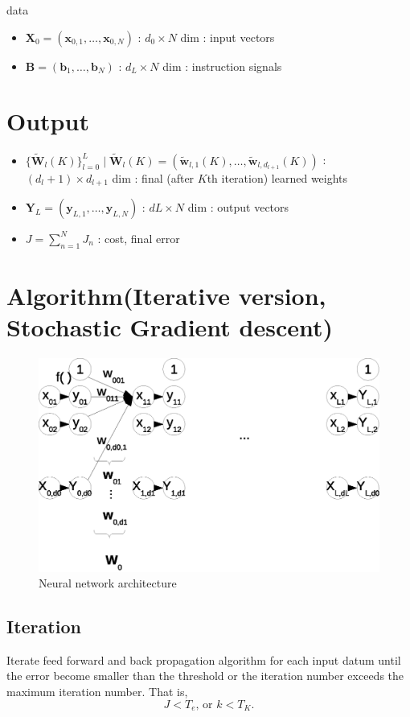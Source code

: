 \documentclass{article}
\begin{document}
data 
\begin{itemize}
\item $\bm{X}_0 = (\bm{x}_{0,1},\dots , \bm{x}_{0,N})$ : $d_0 \times N$ dim : input vectors
\item $\bm{B} = (\bm{b}_1,\dots , \bm{b}_N)$ : $d_L \times N$ dim : instruction signals
\end{itemize}


\section{Output}
\begin{itemize}
\item $\{\bm{\tilde{W}}_l(K)\}_{l=0}^L \mid \bm{\tilde{W}}_l(K) = (\bm{\tilde{w}}_{l,1}(K),\dots ,
  \bm{\tilde{w}}_{l,d_{l+1}}(K))$ : $(d_l+1) \times d_{l+1}$ dim :
  final (after $K$th iteration) learned weights
\item $\bm{Y}_L = (\bm{y}_{L,1},\dots , \bm{y}_{L,N})$ :
  $dL \times N$ dim : output vectors
\item $J = \sum_{n=1}^N J_n$
  : cost, final error
\end{itemize}

\section{Algorithm(Iterative version, Stochastic Gradient descent)}
\begin{figure}
  \centering
  \includegraphics[width=1.0\textwidth]{neuralnet_architecture}
  \caption{Neural network architecture}
  \label{fig:nn}
\end{figure}
\subsection{Iteration}
Iterate feed forward and back propagation algorithm for each input
datum until the error become smaller than the threshold or the
iteration number exceeds the
maximum iteration number. 
That is, 
\begin{equation}
  J < T_e \mbox{, or } k < T_K.
\end{equation}
\end{document}
